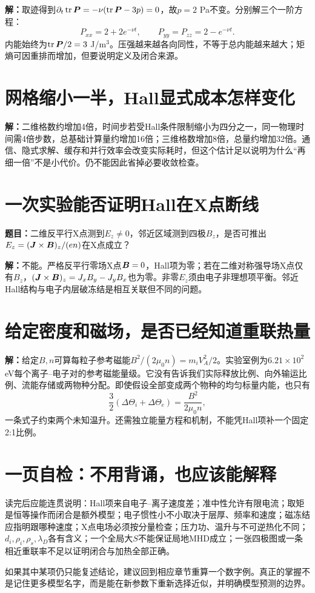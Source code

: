 \textbf{解：}取迹得到$\partial_t\operatorname{tr}\bm{P}=-\nu(\operatorname{tr}\bm{P}-3p)=0$，故$p=2$ Pa不变。分别解三个一阶方程：
\begin{equation}P_{xx}=2+2e^{-\nu t},\qquad P_{yy}=P_{zz}=2-e^{-\nu t}.\end{equation}
内能始终为$\operatorname{tr}\bm{P}/2=3$ J/m$^3$。压强越来越各向同性，不等于总内能越来越大；矩熵可因重排而增加，但要说明定义及闭合来源。

\section{网格缩小一半，Hall显式成本怎样变化}
\textbf{解：}二维格数约增加4倍，时间步若受Hall条件限制缩小为四分之一，同一物理时间需4倍步数，总基础计算量约增加16倍；三维格数增加8倍，总量约增加32倍。通信、隐式求解、缓存和并行效率会改变实际耗时，但这个估计足以说明为什么“再细一倍”不是小代价。仍不能因此省掉必要收敛检查。

\section{一次实验能否证明Hall在X点断线}
\textbf{题目：}二维反平行X点测到$E_z\ne0$，邻近区域测到四极$B_z$，是否可推出$E_z=(\bm{J}\times\bm{B})_z/(en)$在X点成立？

\textbf{解：}不能。严格反平行零场X点$\bm{B}=0$，Hall项为零；若在二维对称强导场X点仅有$B_z$，$(\bm{J}\times\bm{B})_z=J_xB_y-J_yB_x$也为零。非零$E_z$须由电子非理想项平衡。邻近Hall结构与电子内层破冻结是相互关联但不同的问题。

\section{给定密度和磁场，是否已经知道重联热量}
\textbf{解：}给定$B,n$可算每粒子参考磁能$B^2/(2\mu_0n)=m_iV_A^2/2$。实验室例为$6.21\times10^2$ eV每个离子--电子对的参考磁能量级。它没有告诉我们实际释放比例、向外输运比例、流能存储或两物种分配。即使假设全部变成两个物种的均匀标量内能，也只有
\begin{equation}\frac32(\Delta\Theta_i+\Delta\Theta_e)=\frac{B^2}{2\mu_0n},\end{equation}
一条式子约束两个未知温升。还需独立能量方程和机制，不能凭Hall项补一个固定2:1比例。

\section{一页自检：不用背诵，也应该能解释}
读完后应能连贯说明：Hall项来自电子--离子速度差；准中性允许有限电流；取矩是恒等操作而闭合是额外模型；电子惯性小不小取决于层厚、频率和速度；磁冻结应指明跟哪种速度；X点电场必须按分量检查；压力功、温升与不可逆热化不同；$d_i,\rho_i,\rho_s,\lambda_D$各有含义；一个全局大$S$不能保证局地MHD成立；一张四极图或一条相近重联率不足以证明闭合与加热全部正确。

如果其中某项仍只能复述结论，建议回到相应章节重算一个数字例。真正的掌握不是记住更多模型名字，而是能在新参数下重新选择近似，并明确模型预测的边界。
